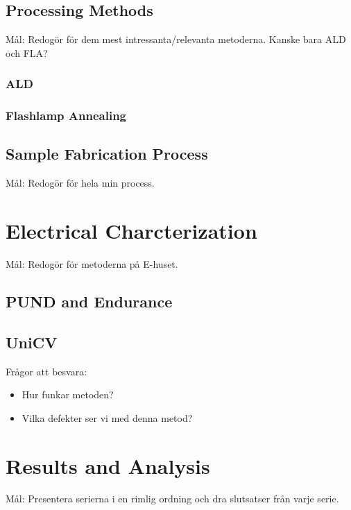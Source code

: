 \documentclass[11pt]{article}
\begin{document}
        \subsection{Processing Methods}

        Mål: Redogör för dem mest intressanta/relevanta metoderna. Kanske bara ALD och FLA?\ 

            \subsubsection{ALD}


            \subsubsection{Flashlamp Annealing}


        \subsection{Sample Fabrication Process}\label{sec:FabProc}

        Mål: Redogör för hela min process.

    \section{Electrical Charcterization}\label{sec:e-char}

    Mål: Redogör för metoderna på E-huset.

        \subsection{PUND and Endurance}\label{sec:PandE}


        \subsection{UniCV}\label{sec:UniCV}
        Frågor att besvara: 
        \begin{itemize}
            \item Hur funkar metoden? 
            \item Vilka defekter ser vi med denna metod? 
        \end{itemize}

    \section{Results and Analysis}
    \iffalse{}
    Mål: Presentera serierna i en rimlig ordning och dra slutsatser från varje serie.
\end{document}
